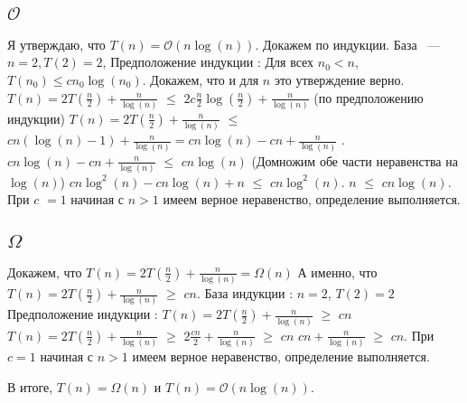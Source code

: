 \documentclass{article}
\begin{document}
\subsection{$\mathcal{O}$}
Я утверждаю, что $T(n) = \mathcal{O}(n\log(n))$. Докажем по индукции. База ~--- $n = 2, T(2) = 2$, 
\newline
Предположение индукции : Для всех $n_{0} < n$, $T(n_{0}) \leq cn_{0}\log(n_{0})$. Докажем, что и для $n$ это утверждение верно.
\newline
$T(n) = 2T(\frac{n}{2}) + \frac{n}{\log(n)}$ $\leq$ $2c\frac{n}{2}\log(\frac{n}{2}) + \frac{n}{\log(n)}$  (по предположению индукции)
\newline
$T(n) = 2T(\frac{n}{2}) + \frac{n}{\log(n)}$ $\leq$ $cn(\log(n) - 1) + \frac{n}{\log(n)} = cn\log(n) - cn + \frac{n}{\log(n)}$ .
\newline
$cn\log(n) - cn + \frac{n}{\log(n)}$ $\leq$ $cn\log(n)$ (Домножим обе части неравенства на $\log(n)$)
$cn\log^{2}(n) - cn\log(n) + n$ $\leq$ $cn\log^{2}(n)$.
\newline
$n$ $\leq$ $cn\log(n)$. 
При $c$ $= 1$ начиная с $n > 1$ имеем верное неравенство, определение выполняется. %

\subsection{$\Omega$}
Докажем, что $T(n) = 2T(\frac{n}{2}) + \frac{n}{\log(n)} = \Omega(n)$
\newline
А именно, что $T(n) = 2T(\frac{n}{2}) + \frac{n}{\log(n)}$ $\geq$ $cn$.
\newline
База индукции : $n = 2$, $T(2) = 2$ 
\newline
Предположение индукции : $T(n) = 2T(\frac{n}{2}) + \frac{n}{\log(n)}$ $\geq$ $cn$
\newline%
$T(n) = 2T(\frac{n}{2}) + \frac{n}{\log(n)}$ $\geq$ $2\frac{cn}{2} + \frac{n}{\log(n)}$ $\geq$ $cn$
\newline
$cn + \frac{n}{\log(n)}$ $\geq$ $cn$. При $c = 1$ начиная с $n > 1$ имеем верное неравенство, определение выполняется.
\newline

В итоге, $T(n) = \Omega(n)$ и $T(n) = \mathcal{O}(n\log(n))$.
\end{document}
